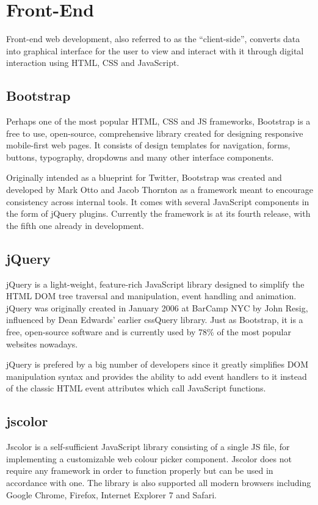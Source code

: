 \documentclass{report}
\begin{document}
\section {Front-End}
Front-end web development, also referred to as the “client-side”, converts data into graphical interface for the user to view and interact with it through digital interaction using HTML, CSS and JavaScript.

\subsection {Bootstrap}
Perhaps one of the most popular HTML, CSS and JS frameworks, Bootstrap is a free to use, open-source, comprehensive library created for designing responsive mobile-first web pages. It consists of design templates for navigation, forms, buttons, typography, dropdowns and many other interface components. \par

Originally intended as a blueprint for Twitter, Bootstrap was created and developed by Mark Otto and Jacob Thornton as a framework meant to encourage consistency across internal tools. It comes with several JavaScript components in the form of jQuery plugins. Currently the framework is at its fourth release, with the fifth one already in development.

\subsection {jQuery}
jQuery is a light-weight, feature-rich JavaScript library designed to simplify the HTML DOM tree traversal and manipulation, event handling and animation. jQuery was originally created in January 2006 at BarCamp NYC by John Resig, influenced by Dean Edwards' earlier cssQuery library. Just as Bootstrap, it is a free,  open-source software and is currently used by 78\% of the most popular websites nowadays. \par
jQuery is prefered by a big number of developers since it greatly simplifies DOM manipulation syntax and provides the ability to add event handlers to it instead of the classic HTML event attributes which call JavaScript functions.

\subsection {jscolor}
Jscolor is a self-sufficient JavaScript library consisting of a single JS file, for implementing a customizable web colour picker component. Jscolor does not require any framework in order to function properly but can be used in accordance with one. The library is also supported all modern browsers including Google Chrome, Firefox, Internet Explorer 7 and Safari.
\end{document}
